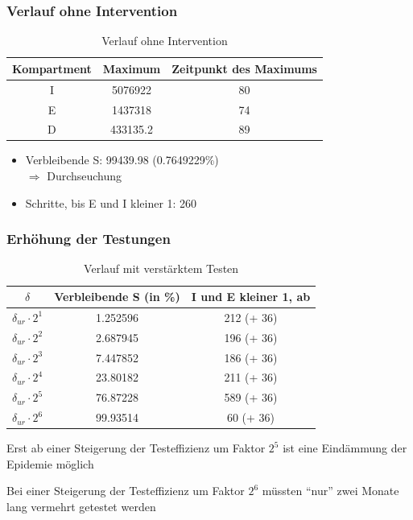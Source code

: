 \documentclass{beamer}
\begin{document}
\begin{frame}
	\frametitle{Verlauf ohne Intervention}
	\begin{table}[h]
		\caption{Verlauf ohne Intervention}
		\centering
		\begin{tabular}{@{}ccc@{}}
			\toprule
			Kompartment & Maximum & Zeitpunkt des Maximums\\ 
			\midrule
			I &  5076922& 80\\ 
			E & 1437318 & 74\\ 
			D &  433135.2 & 89 \\ 
			\bottomrule
		\end{tabular}
	\end{table}
	\vspace{0.5cm}
	\begin{itemize}
		\item Verbleibende S: 99439.98 (0.7649229\%)\\	$\Rightarrow$ Durchseuchung
		\item Schritte, bis E und I kleiner 1: 260
	\end{itemize}
\end{frame}

\begin{frame}
	\frametitle{Erhöhung der Testungen}
	\begin{table}[h]
		\caption{Verlauf mit verstärktem Testen}
		\centering
		\begin{tabular}{@{}ccc@{}}
			\toprule
			$\delta$ & Verbleibende S (in \%) & I und E kleiner 1, ab\\ 
			\midrule
			 $\delta_{ur} \cdot 2^1$ & 1.252596 & 212 (+ 36) \\ 
			 $\delta_{ur} \cdot 2^2$ & 2.687945 & 196 (+ 36)\\  
			 $\delta_{ur} \cdot 2^3$ & 7.447852 & 186 (+ 36)\\ 
			 $\delta_{ur} \cdot 2^4$ & 23.80182 & 211 (+ 36)\\ 
			 $\delta_{ur} \cdot 2^5$ & 76.87228 & 589 (+ 36)\\ 
			 $\delta_{ur} \cdot 2^6$ & 99.93514 & 60 (+ 36)\\ 
			\bottomrule
		\end{tabular}
	\end{table}
	\vspace{0.5cm}
	\begin{arrowlist}
		\item Erst ab einer Steigerung der Testeffizienz um Faktor $2^5$ ist eine Eindämmung der Epidemie möglich
		\item Bei einer Steigerung der Testeffizienz um Faktor $2^6$ müssten \enquote{nur} zwei Monate lang vermehrt getestet werden
	\end{arrowlist}
\end{frame}
\end{document}
